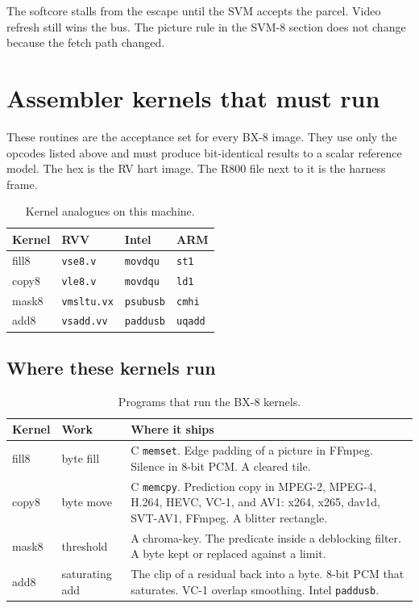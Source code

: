 The softcore stalls from the escape until the SVM accepts the parcel. Video refresh still wins the bus. The picture rule in the SVM-8 section does not change because the fetch path changed.

\section{Assembler kernels that must run}

These routines are the acceptance set for every BX-8 image. They use only the opcodes listed above and must produce bit-identical results to a scalar reference model. The hex is the RV hart image. The R800 file next to it is the harness frame.

\begin{table}[htbp]
\centering
\caption{Kernel analogues on this machine.}
\small
\begin{tabular}{@{}llll@{}}
\toprule
Kernel & RVV & Intel & ARM \\
\midrule
fill8  & \texttt{vse8.v}   & \texttt{movdqu}   & \texttt{st1} \\
copy8  & \texttt{vle8.v}   & \texttt{movdqu}   & \texttt{ld1} \\
mask8  & \texttt{vmsltu.vx} & \texttt{psubusb} & \texttt{cmhi} \\
add8   & \texttt{vsadd.vv} & \texttt{paddusb}  & \texttt{uqadd} \\
\bottomrule
\end{tabular}
\end{table}

\subsection{Where these kernels run}

\begin{table}[htbp]
\centering
\caption{Programs that run the BX-8 kernels.}
\begingroup
\scriptsize
\setlength{\tabcolsep}{3pt}
\begin{tabular}{@{}llp{7.4cm}@{}}
\toprule
Kernel & Work & Where it ships \\
\midrule
fill8 & byte fill & C \texttt{memset}. Edge padding of a picture in FFmpeg. Silence in 8-bit PCM. A cleared tile. \\
copy8 & byte move & C \texttt{memcpy}. Prediction copy in MPEG-2, MPEG-4, H.264, HEVC, VC-1, and AV1: x264, x265, dav1d, SVT-AV1, FFmpeg. A blitter rectangle. \\
mask8 & threshold & A chroma-key. The predicate inside a deblocking filter. A byte kept or replaced against a limit. \\
add8 & saturating add & The clip of a residual back into a byte. 8-bit PCM that saturates. VC-1 overlap smoothing. Intel \texttt{paddusb}. \\
\bottomrule
\end{tabular}
\endgroup
\end{table}

